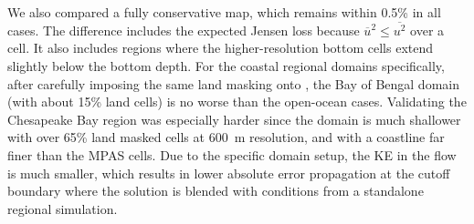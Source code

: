We also compared a fully conservative map, which remains within 0.5\% in all cases. The difference includes the expected Jensen loss because $\overline{u}^2\le\overline{u^2}$ over a \ROMS cell. It also includes regions where the higher-resolution \ROMS bottom cells extend slightly below the \MPAS bottom depth.
%
For the coastal regional domains specifically, after carefully imposing the same \MPAS land masking onto \ROMS, the Bay of Bengal domain (with about 15\% land cells) is no worse than the open-ocean cases.  Validating the Chesapeake Bay region was especially harder since the domain is much shallower with over 65\% land masked cells at 600~m resolution, and with a coastline far finer than the MPAS cells. Due to the specific domain setup, the KE in the flow is much smaller, which results in lower absolute error propagation at the cutoff boundary where the solution is blended with conditions from a standalone regional simulation. 


